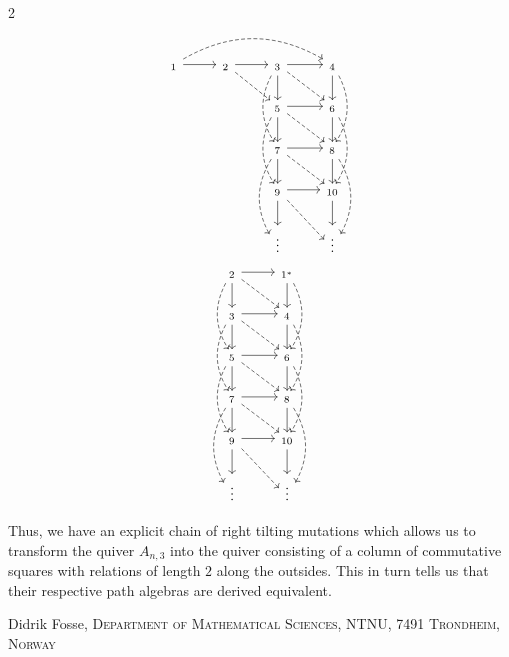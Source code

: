 \documentclass[12pt, dvipsnames, oneside]{amsart}
\theoremstyle{definition}
\newcommand{\Addresses}{{%
  \bigskip
  \footnotesize

  Didrik Fosse, \textsc{Department of Mathematical Sciences, NTNU,
    7491 Trondheim, Norway}\par\nopagebreak
}}
\begin{document}
\begin{multicols}{2}
\begin{equation*}
\begin{tikzcd}
 _{1} \arrow[r] \arrow[rrr, bend left, dashed] & _{2} \arrow[r] \arrow[dr, dashed] & _3 \arrow[d] \arrow[r] \arrow[dr, dashed] \arrow[dd, bend right, dashed] & _{4} \arrow[d] \arrow[dd, bend left, dashed] \\
& & _5 \arrow[d] \arrow[r] \arrow[dd, bend right, dashed] \arrow[dr, dashed]  & _{6} \arrow[d] \arrow[dd, bend left, dashed]  \\
  & & _{7} \arrow[d] \arrow[r] \arrow[dr, dashed] \arrow[dd, bend right, dashed] & _{8} \arrow[d] \arrow[dd, bend left, dashed] \\
 & & _{9} \arrow[d] \arrow[r] \arrow[dr, dashed] & _{10} \arrow[d]  \\
 & & \vdots & \vdots
\end{tikzcd}
\end{equation*}
\begin{equation*}
\begin{tikzcd}
 _{2} \arrow[r] \arrow[d] \arrow[dd, bend right, dashed] \arrow[dr, dashed] & _{1^*} \arrow[d] \arrow[dd, bend left, dashed] \\
  _3 \arrow[d] \arrow[r] \arrow[dr, dashed] \arrow[dd, bend right, dashed] & _{4} \arrow[d] \arrow[dd, bend left, dashed] \\
 _5 \arrow[d] \arrow[r] \arrow[dd, bend right, dashed] \arrow[dr, dashed]  & _{6} \arrow[d] \arrow[dd, bend left, dashed]  \\
 _{7} \arrow[d] \arrow[r] \arrow[dr, dashed] \arrow[dd, bend right, dashed] & _{8} \arrow[d] \arrow[dd, bend left, dashed] \\
_{9} \arrow[d] \arrow[r] \arrow[dr, dashed] & _{10} \arrow[d]  \\
 \vdots & \vdots
\end{tikzcd}
\end{equation*}
\end{multicols}
Thus, we have an explicit chain of right tilting mutations which allows us to transform the quiver $A_{n,3}$ into the quiver consisting of a column of commutative squares with relations of length $2$ along the outsides. 
This in turn tells us that their respective path algebras are derived equivalent.

\bigskip

\printbibliography

\Addresses
\end{document}
